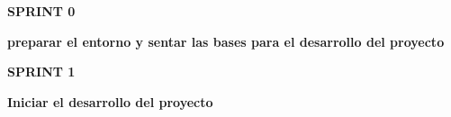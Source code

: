 \documentclass[a4paper]{article} %
\begin{document}
    \hfill
    \vfill
    \begin{center}
        \Huge \textbf{SPRINT 0 }\par\vspace{1cm}
        \huge \textbf{preparar el entorno y sentar las bases para el desarrollo del
        proyecto}
    \end{center}
    \vfill
    \hfill




\clearpage  %


\clearpage  %

\hfill
\vfill
\begin{center}
    \Huge \textbf{SPRINT 1 }\par\vspace{1cm}
    \huge \textbf{Iniciar el desarrollo del proyecto}
\end{center}
\vfill
\hfill


\clearpage  %


\end{document}
